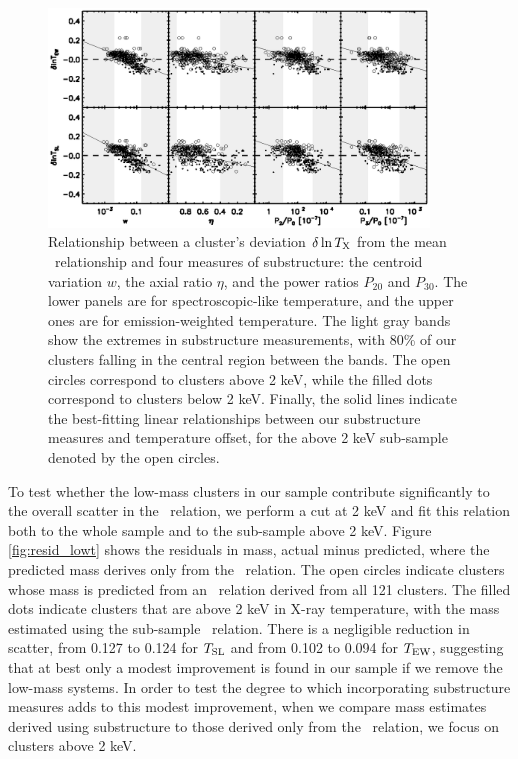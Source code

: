 \documentclass{aastex} \usepackage{natbib}
\begin{document}
\begin{figure}[b]
  \centering
  \includegraphics[width=0.9\textwidth]{f6.eps}
  \caption{Relationship between a cluster's deviation $\delta \ln T_{\rm X}$
    from the mean \mtx\ relationship and four measures of
    substructure: the centroid variation $w$, the axial ratio $\eta$,
    and the power ratios $P_{20}$ and $P_{30}$.  The lower panels are
    for spectroscopic-like temperature, and the upper ones are for
    emission-weighted temperature.  The light gray bands show the
    extremes in substructure measurements, with 80\% of our clusters
    falling in the central region between the bands.  The open circles
    correspond to clusters above 2 keV, while the filled dots
    correspond to clusters below 2 keV.  Finally, the solid lines
    indicate the best-fitting linear relationships between our
    substructure measures and temperature offset, for the above 2 keV
    sub-sample denoted by the open circles.}
  \label{fig:substruct_dev_temp}
\end{figure}

To test whether the low-mass clusters in our sample contribute
significantly to the overall scatter in the \mtx\ relation, we perform
a cut at 2 keV and fit this relation both to the whole sample and to
the sub-sample above 2 keV.  Figure \ref{fig:resid_lowt} shows the
residuals in mass, actual minus predicted, where the predicted mass
derives only from the \mtx\ relation.  The open circles indicate
clusters whose mass is predicted from an \mtx\ relation derived from
all 121 clusters.  The filled dots indicate clusters that are above 2
keV in X-ray temperature, with the mass estimated using the sub-sample
\mtx\ relation.  There is a negligible reduction in scatter, from
0.127 to 0.124 for $T_{\rm SL}$ and from 0.102 to 0.094 for $T_{\rm EW}$,
suggesting that at best only a modest improvement is found in our
sample if we remove the low-mass systems.  In order to test the degree
to which incorporating substructure measures adds to this modest
improvement, when we compare mass estimates derived using substructure
to those derived only from the \mtx\ relation, we focus on clusters
above 2 keV.
\end{document}
